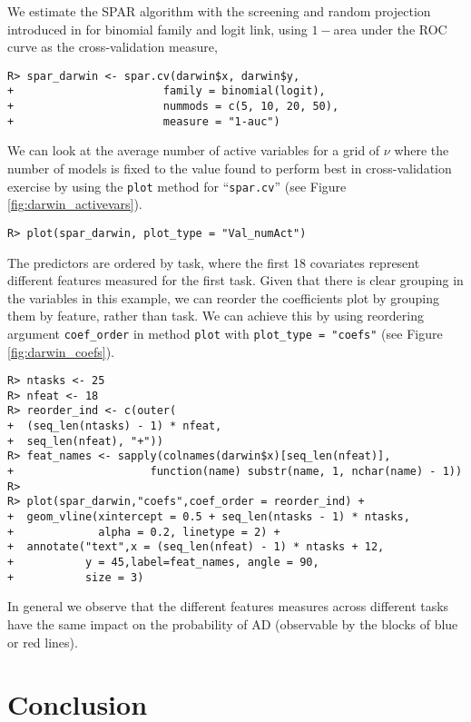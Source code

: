 \documentclass[
  article]{jss}
\begin{document}
We estimate the SPAR algorithm with the screening and random projection
introduced in \citet{parzer2024glms} for binomial family and logit link,
using \(1-\)area under the ROC curve as the cross-validation measure,

\begin{verbatim}
R> spar_darwin <- spar.cv(darwin$x, darwin$y,
+                       family = binomial(logit),
+                       nummods = c(5, 10, 20, 50),
+                       measure = "1-auc")
\end{verbatim}

We can look at the average number of active variables for a grid of
\(\nu\) where the number of models is fixed to the value found to
perform best in cross-validation exercise by using the \texttt{plot}
method for ``\texttt{spar.cv}'' (see Figure
\ref{fig:darwin_activevars}).

\begin{verbatim}
R> plot(spar_darwin, plot_type = "Val_numAct")
\end{verbatim}

The predictors are ordered by task, where the first 18 covariates
represent different features measured for the first task. Given that
there is clear grouping in the variables in this example, we can reorder
the coefficients plot by grouping them by feature, rather than task. We
can achieve this by using reordering argument \texttt{coef\_order} in
method \texttt{plot} with \texttt{plot\_type\ =\ "coefs"} (see Figure
\ref{fig:darwin_coefs}).

\begin{verbatim}
R> ntasks <- 25
R> nfeat <- 18
R> reorder_ind <- c(outer(
+  (seq_len(ntasks) - 1) * nfeat,
+  seq_len(nfeat), "+"))
R> feat_names <- sapply(colnames(darwin$x)[seq_len(nfeat)],
+                     function(name) substr(name, 1, nchar(name) - 1))
R> 
R> plot(spar_darwin,"coefs",coef_order = reorder_ind) + 
+  geom_vline(xintercept = 0.5 + seq_len(ntasks - 1) * ntasks, 
+             alpha = 0.2, linetype = 2) +
+  annotate("text",x = (seq_len(nfeat) - 1) * ntasks + 12,
+           y = 45,label=feat_names, angle = 90,
+           size = 3)
\end{verbatim}

In general we observe that the different features measures across
different tasks have the same impact on the probability of AD
(observable by the blocks of blue or red lines).

\section{Conclusion}\label{sec-conclusion}
\end{document}

